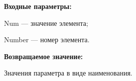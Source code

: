 \textbf{Входные параметры:}

Num --- значение элемента;
 
    Number --- номер элемента.

\textbf{Возвращаемое значение:}

Значения параметра в виде наименования.
